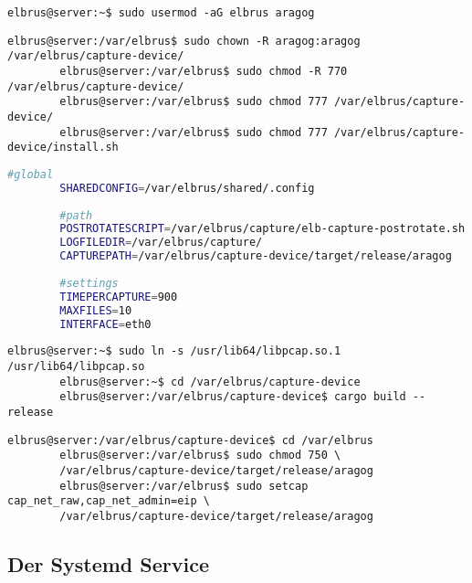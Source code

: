 	\lstset{style=commands}
	\begin{lstlisting}[caption={Hinzufügen von User 'aragog' zu Gruppe 'elbrus'.}]
		elbrus@server:~$ sudo usermod -aG elbrus aragog
	\end{lstlisting}

	\lstset{style=commands}
	\begin{lstlisting}[caption={Wechseln des Owners \& der Berechtigung auf '/var/elbrus/capture-device/'}]
		elbrus@server:/var/elbrus$ sudo chown -R aragog:aragog /var/elbrus/capture-device/
		elbrus@server:/var/elbrus$ sudo chmod -R 770 /var/elbrus/capture-device/
		elbrus@server:/var/elbrus$ sudo chmod 777 /var/elbrus/capture-device/
		elbrus@server:/var/elbrus$ sudo chmod 777 /var/elbrus/capture-device/install.sh
	\end{lstlisting}
	
	\lstset{style=files}
	\begin{lstlisting}[caption={Anhand von '.env.example' eigene '.env' Datei anlegen.}, language=bash]
		#global
		SHAREDCONFIG=/var/elbrus/shared/.config
		
		#path
		POSTROTATESCRIPT=/var/elbrus/capture/elb-capture-postrotate.sh
		LOGFILEDIR=/var/elbrus/capture/
		CAPTUREPATH=/var/elbrus/capture-device/target/release/aragog
		
		#settings
		TIMEPERCAPTURE=900
		MAXFILES=10
		INTERFACE=eth0
	\end{lstlisting}

	\lstset{style=commands}
	\begin{lstlisting}[caption={Kompilieren des 'capture-device'.}]
		elbrus@server:~$ sudo ln -s /usr/lib64/libpcap.so.1 /usr/lib64/libpcap.so
		elbrus@server:~$ cd /var/elbrus/capture-device
		elbrus@server:/var/elbrus/capture-device$ cargo build --release 
	\end{lstlisting}
	
	\lstset{style=commands}
	\begin{lstlisting}[caption={Erteilen der Berechtigung zum Aufzeichenen von Packages.}]
		elbrus@server:/var/elbrus/capture-device$ cd /var/elbrus
		elbrus@server:/var/elbrus$ sudo chmod 750 \
		/var/elbrus/capture-device/target/release/aragog
		elbrus@server:/var/elbrus$ sudo setcap cap_net_raw,cap_net_admin=eip \
		/var/elbrus/capture-device/target/release/aragog
	\end{lstlisting}
	\newpage
	
	\subsection[systemd service]{Der Systemd Service}
	

